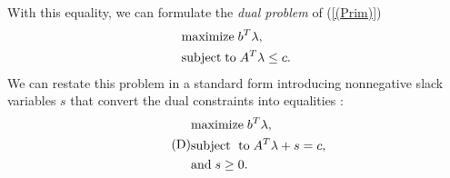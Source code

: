 \documentclass[a4paper,10 pt,titlepage,twoside]{book}
\theoremstyle{plain}
\theoremstyle{definition}
\theoremstyle{remark}
\begin{document}
With this equality, we can formulate the \textit{dual problem} of (\ref{(Prim)})
\begin{equation}\label{Dual}
\begin{split}
&\text{maximize\;} b^{T}\lambda,\\
&\text{subject\;to\;}A^{T}\lambda \leq c.
\end{split}
\end{equation} 
We can restate this problem in a standard form introducing nonnegative slack variables $s$ that convert the dual constraints into equalities :
\begin{equation}\tag{D}\label{(Dual)}
\begin{split}
&\text{maximize\;}b^{T}\lambda,\\
&\text{subject\; to\;}A^{T}\lambda+s=c,\\ &\text{and\;} s\geq0.
\end{split}
\end{equation}
\end{document}

